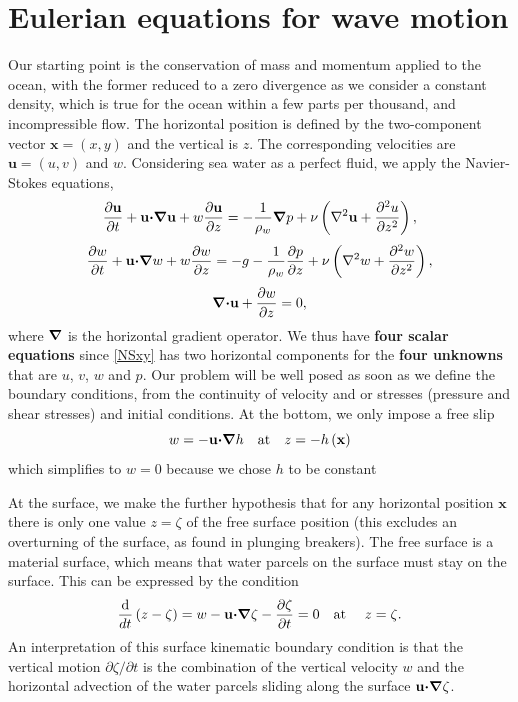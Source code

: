 \section{Eulerian equations for wave motion}
Our starting point is the conservation of mass and momentum applied to 
the ocean, with the former reduced to a zero divergence as we consider a constant density, which is 
true for the ocean within a few parts per thousand, and incompressible flow. 
The horizontal position is defined by the two-component vector 
${\mathbf x}=\left(x,y\right)$ and the vertical is $z$. The corresponding velocities are 
${\mathbf u}=\left(u,v\right)$ and $w$. Considering sea water as a perfect fluid, 
we apply the Navier-Stokes equations, 
\begin{equation}
    \frac{\partial {\mathbf u}}{\partial t}+{\mathbf u}\mbox{\boldmath $\cdot$}\mbox{\boldmath $\nabla$}{\mathbf u}
    + w \frac{\partial {\mathbf u}}{\partial z}
    =-\frac{1}{\rho_w} \mbox{\boldmath $\nabla$} p +
    \nu \left(\nabla^2 {\mathbf u}+\frac{\partial^2 u}{\partial z^2}\right),
    \label{NSxy}
\end{equation}
\begin{equation}
    \frac{\partial w}{\partial t}+{\mathbf u}\mbox{\boldmath $\cdot$}\mbox{\boldmath $\nabla$} w
    + w \frac{\partial w}{\partial z}
    =-g - \frac{1}{\rho_w} \frac{\partial p}{\partial z} +
    \nu \left(\nabla^2 w+\frac{\partial^2 w}{\partial z^2}\right),
    \label{NSz}
\end{equation}
\begin{equation}
\mbox{\boldmath $\nabla$}\mbox{\boldmath $\cdot$}{\mathbf u} + \frac{\partial w}{\partial z}=0,
\end{equation}
where $\mbox{\boldmath $\nabla$}$ is the horizontal gradient operator. We thus have \textbf{four scalar equations} since \ref{NSxy} has two horizontal components
for the \textbf{four unknowns} that are $u$, $v$,
 $w$ and $p$. Our problem will be well posed as soon as we define the boundary conditions, from the continuity of 
velocity and or stresses (pressure and shear stresses) and initial conditions. At the bottom, we only impose a free slip
 \begin{equation}
w=-{\mathbf u} \mbox{\boldmath $\cdot$} \mbox{\boldmath $\nabla$} h \quad \mbox{at} \quad
z=-h\left({\mathbf x}\right)
\end{equation}
which simplifies to $w=0$ because we chose $h$ to be constant

At the surface, we make the further hypothesis that for any horizontal position $\mathbf{x}$ there is only one value $z=\zeta$ 
of the free surface position (this excludes an overturning of the surface, as found in plunging breakers). 
The free surface is a material surface, which means that water parcels on the surface must stay on the surface. 
This can be expressed by the condition 
\begin{equation}
    \frac{\rm d}{dt}\left(z-\zeta\right)=
    w - {\mathbf u} \mbox{\boldmath $\cdot$} \mbox{\boldmath $\nabla$} \zeta -\frac{\partial \zeta }{\partial t}= 0
    \quad \mbox{at\ }\quad z=\zeta.\label{eq:skbc}
\end{equation}
An interpretation of this surface kinematic boundary condition 
is that the vertical motion 
${\partial \zeta }/{\partial t}$ is the combination of the vertical velocity 
$w$ and the horizontal advection of the water parcels sliding along the surface ${\mathbf u} \mbox{\boldmath $\cdot$} \mbox{\boldmath $\nabla$} \zeta$.

